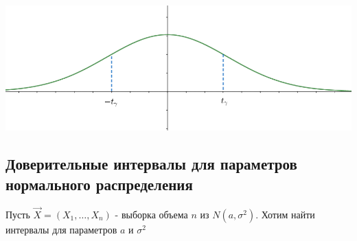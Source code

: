 
\begin{center}
    \includegraphics[width=15cm]{mathstat/images/mathstat_2025_03_11_2}
\end{center}

\subsection{Доверительные интервалы для параметров нормального распределения}

Пусть $\vec X = (X_1, \dots, X_n)$ - выборка объема $n$ из $N(a, \sigma^2)$. 
Хотим найти интервалы для параметров $a$ и $\sigma^2$

